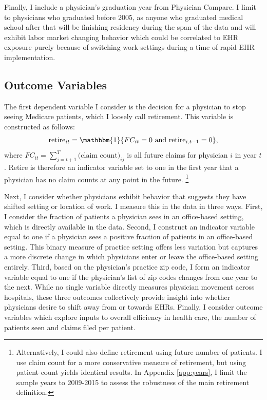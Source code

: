 \documentclass[12pt]{article}
\begin{document}
Finally, I include a physician's graduation year from Physician Compare. I limit to physicians who graduated before 2005, as anyone who graduated medical school after that will be finishing residency during the span of the data and will exhibit labor market changing behavior which could be correlated to EHR exposure purely because of switching work settings during a time of rapid EHR implementation.

\subsection{Outcome Variables}\label{sec:outcome}

The first dependent variable I consider is the decision for a physician to stop seeing Medicare patients, which I loosely call retirement. This variable is constructed as follows: 
$$\text{retire}_{it}=\mathbbm{1}\{FC_{it}=0 \text{ and retire}_{i,t-1}=0\}, $$
where $FC_{it}=\sum\limits_{j=t+1}^T\text{(claim count)}_{ij}$ is all future claims for physician $i$ in year $t$. Retire is therefore an indicator variable set to one in the first year that a physician has no claim counts at any point in the future. \footnote{Alternatively, I could also define retirement using future number of patients. I use claim count for a more conservative measure of retirement, but using patient count yields identical results. In Appendix \ref{app:years}, I limit the sample years to 2009-2015 to assess the robustness of the main retirement definition.}

Next, I consider whether physicians exhibit behavior that suggests they have shifted setting or location of work. I measure this in the data in three ways. First, I consider the fraction of patients a physician sees in an office-based setting, which is directly available in the data. Second, I construct an indicator variable equal to one if a physician sees a positive fraction of patients in an office-based setting. This binary measure of practice setting offers less variation but captures a more discrete change in which physicians enter or leave the office-based setting entirely. Third, based on the physician's practice zip code, I form an indicator variable equal to one if the physician's list of zip codes changes from one year to the next. While no single variable directly measures physician movement across hospitals, these three outcomes collectively provide insight into whether physicians desire to shift away from or towards EHRs. Finally, I consider outcome variables which explore inputs to overall efficiency in health care, the number of patients seen and claims filed per patient.
\end{document}
